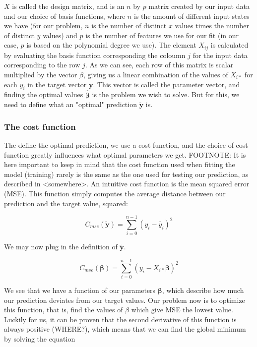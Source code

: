 \documentclass[twocolumn,10pt,cleanfoot]{asme2ej}
\begin{document}
$X$ is called the design matrix, and is an $n$ by $p$ matrix created by our input data and our choice of basis functions, where $n$ is the amount of different input states we have (for our problem, $n$ is the number of distinct $x$ values times the number of distinct $y$ values) and $p$ is the number of features we use for our fit (in our case, $p$ is based on the polynomial degree we use). The element $X_{ij}$ is calculated by evaluating the basis function corresponding the coloumn $j$ for the input data corresponding to the row $j$. As we can see, each row of this matrix is scalar multiplied by the vector $\beta$, giving us a linear combination of the values of $X_{i*}$ for each $y_i$ in the target vector $\bm{y}$. This vector is called the parameter vector, and finding the optimal values $\hat{\bm{\beta}}$ is the problem we wish to solve. But for this, we need to define what an "optimal" prediction $\bm{\tilde{y}}$ is.

\subsubsection{The cost function}

The define the optimal prediction, we use a cost function, and the choice of cost function greatly influences what optimal parameters we get. FOOTNOTE: It is here important to keep in mind that the cost function used when fitting the model (training) rarely is the same as the one used for testing our prediction, as described in <somewhere>. An intuitive cost function is the mean squared error (MSE). This function simply computes the average distance between our prediction and the target value, squared:

\begin{equation}
	C_{mse}(\tilde{\bm{y}}) = \sum_{i=0}^{n-1}(y_i-\tilde{y_i})^2
\end{equation}

We may now plug in the definition of $\bm{\tilde{y}}$.

\begin{equation}
	C_{mse}(\bm{\beta}) = \sum_{i=0}^{n-1}(y_i-X_{i*}\bm{\beta})^2
\end{equation}

We see that we have a function of our parameters $\bm{\beta}$, which describe how much our prediction deviates from our target values. Our problem now is to optimize this function, that is, find the values of $\beta$ which give MSE the lowest value. Luckily for us, it can be proven that the second derivative of this function is always positive (WHERE?), which means that we can find the global minimum by solving the equation
\end{document}
